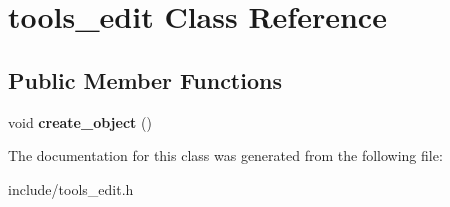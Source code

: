 \hypertarget{classtools__edit}{}\section{tools\+\_\+edit Class Reference}
\label{classtools__edit}
\subsection*{Public Member Functions}
\begin{DoxyCompactItemize}
\item 
\mbox{\label{classtools__edit_a76d0ef81d7b825a58fbc5d9f33816fc3}} 
void {\bfseries create\+\_\+object} ()
\end{DoxyCompactItemize}


The documentation for this class was generated from the following file\+:\begin{DoxyCompactItemize}
\item 
include/tools\+\_\+edit.\+h\end{DoxyCompactItemize}
